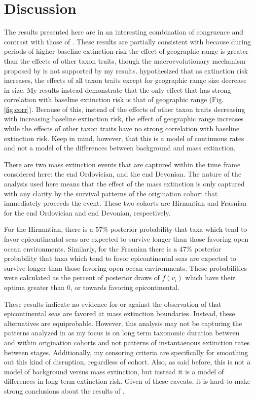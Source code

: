 \documentclass[12pt,letterpaper]{article}
\begin{document}
\section{Discussion}

The results presented here are in an interesting combination of congruence and contrast with those of \citet{Jablonski1986}.  These results are partially consistent with \citet{Jablonski1986} because during periods of higher baseline extinction risk the effect of geographic range is greater than the effects of other taxon traits, though the macroevolutionary mechanism proposed by \citet{Jablonski1986} is not supported by my results. \citet{Jablonski1986} hypothesized that as extinction risk increases, the effects of all taxon traits except for geographic range size decrease in size. My results instead demonstrate that the only effect that has strong correlation with baseline extinction risk is that of geographic range (Fig. \ref{fig:corr}). Because of this, instead of the effects of other taxon traits decreasing with increasing baseline extinction risk, the effect of geographic range increases while the effects of other taxon traits have no strong correlation with baseline extinction risk. Keep in mind, however, that this is a model of continuous rates and not a model of the differences between background and mass extinction.

There are two mass extinction events that are captured within the time frame considered here: the end Ordovician, and the end Devonian. The nature of the analysis used here means that the effect of the mass extinction is only captured with any clarity by the survival patterns of the origination cohort that immediately proceeds the event. These two cohorts are Hirnantian and Frasnian for the end Ordovician and end Devonian, respectively.

For the Hirnantian, there is a 57\% posterior probability that taxa which tend to favor epicontinental seas are expected to survive longer than those favoring open ocean environments. Similarly, for the Frasnian there is a 47\% posterior probability that taxa which tend to favor epicontinental seas are expected to survive longer than those favoring open ocean environments. These probabilities were calculated as the percent of posterior draws of \(f(v_{i})\) which have their optima greater than 0, or towards favoring epicontinental. 

These results indicate no evidence for or against the observation of \citet{Miller2009a} that epicontinental seas are favored at mass extinction boundaries. Instead, these alternatives are equiprobable. However, this analysis may not be capturing the patterns analyzed in \citet{Miller2009a} as my focus is on long term taxonomic duration between and within origination cohorts and not patterns of instantaenous extinction rates between stages. Additionally, my censoring criteria are specifically for smoothing out this kind of disruption, regardless of cohort. Also, as said before, this is not a model of background versus mass extinction, but instead it is a model of differences in long term extinction risk. Given of these caveats, it is hard to make strong conclusions about the results of \citet{Miller2009a}.
\end{document}
